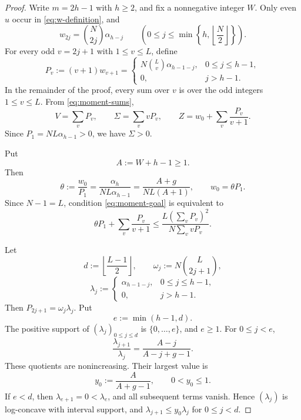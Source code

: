 \documentclass[12pt]{amsart}
\theoremstyle{plain}
\theoremstyle{definition}
\theoremstyle{remark}
\begin{document}
\begin{proof}
Write \(m=2h-1\) with \(h\ge2\), and fix a nonnegative integer \(W\).
Only even \(u\)
occur in \eqref{eq:w-definition}, and
\[
 w_{2j}=\binom N{2j}\alpha_{h-j}
 \qquad
 \left(0\le j\le\min\left\{h,\left\lfloor\frac N2\right\rfloor\right\}\right).
\]
For every odd \(v=2j+1\) with \(1\le v\le L\), define
\[
 P_v:=(v+1)w_{v+1}
 =
 \begin{cases}
  \displaystyle
  N\binom Lv\alpha_{h-1-j},&0\le j\le h-1,\\[5pt]
  0,&j>h-1.
 \end{cases}
\]
In the remainder of the proof, every sum over \(v\) is over the odd
integers \(1\le v\le L\).  From \eqref{eq:moment-sums},
\begin{equation}\label{eq:odd-dictionary}
 V=\sum_vP_v,\qquad
 \Sigma=\sum_vvP_v,\qquad
 Z=w_0+\sum_v\frac{P_v}{v+1}.
\end{equation}
Since \(P_1=NL\alpha_{h-1}>0\), we have \(\Sigma>0\).

Put
\[
 A:=W+h-1\ge1.
\]
Then
\begin{equation}\label{eq:theta-definition}
 \theta:=\frac{w_0}{P_1}
 =\frac{\alpha_h}{NL\alpha_{h-1}}
 =\frac{A+g}{NL(A+1)},
 \qquad
 w_0=\theta P_1.
\end{equation}
Since \(N-1=L\), condition \eqref{eq:moment-goal} is equivalent to
\begin{equation}\label{eq:odd-goal}
 \theta P_1+\sum_v\frac{P_v}{v+1}
 \le
 \frac{L\left(\sum_vP_v\right)^2}
 {N\sum_vvP_v}.
\end{equation}

Let
\[
 d:=\left\lfloor\frac{L-1}{2}\right\rfloor,
 \qquad
 \omega_j:=N\binom L{2j+1},
\]
\[
 \lambda_j:=
 \begin{cases}
  \alpha_{h-1-j},&0\le j\le h-1,\\
  0,&j>h-1.
 \end{cases}
\]
Then \(P_{2j+1}=\omega_j\lambda_j\).  Put
\[
 e:=\min(h-1,d).
\]
The positive support of \((\lambda_j)_{0\le j\le d}\) is
\(\{0,\ldots,e\}\), and \(e\ge1\).  For \(0\le j<e\),
\[
 \frac{\lambda_{j+1}}{\lambda_j}
 =
 \frac{A-j}{A-j+g-1}.
\]
These quotients are nonincreasing.  Their largest value is
\[
 y_0:=\frac{A}{A+g-1},
 \qquad
 0<y_0\le1.
\]
If \(e<d\), then \(\lambda_{e+1}=0<\lambda_e\), and all subsequent
terms vanish.  Hence \((\lambda_j)\) is log-concave with interval support,
and
\(\lambda_{j+1}\le y_0\lambda_j\) for \(0\le j<d\).


\end{proof}
\end{document}
